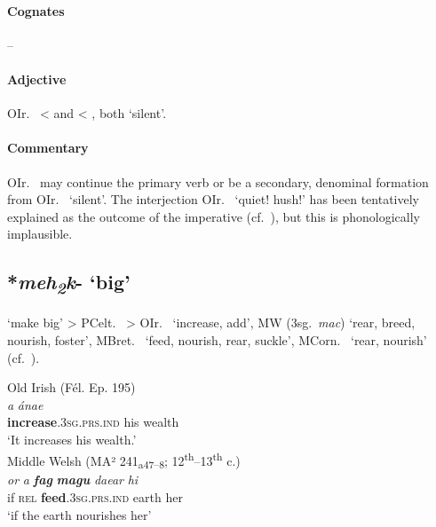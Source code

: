 \documentclass[output=paper,colorlinks,citecolor=brown]{langscibook}
\begin{document}
\paragraph*{Cognates}  -- 

\paragraph*{Adjective}

OIr.\  <  and  < , both `silent'. 

\paragraph*{Commentary}

OIr.\  may continue the primary verb  or be a secondary, denominal formation  from OIr.\   ‘silent’. The interjection OIr.\   ‘quiet! hush!’ has been tentatively explained as the outcome of the imperative  (cf.\ ), but this is phonologically implausible.

\subsection{*\textit{meh\textsubscript{2}k}- ‘big’}
\label{sec:STPbig}

 ‘make big’ > PCelt.\  > OIr.\   ‘increase, add’, MW  (3sg.\ \textit{mac}) ‘rear, breed, nourish, foster’, MBret.\  ‘feed, nourish, rear, suckle’, MCorn.\  ‘rear, nourish’ (cf.\ \citealt[466--470]{Schumacher2004}).

\begin{exe}
    \ex Old Irish (Fél. Ep. 195)\label{ex:STPbig1}\\
         \textit{a} \textit{ánae}  \\
        \textbf{increase}.\textsc{3sg.prs.ind} his wealth\\
        \glt ‘It increases his wealth.’\\
    \ex Middle Welsh (MA² 241\textsubscript{a47--8}; 12\textsuperscript{th}--13\textsuperscript{th} c.) \label{ex:STPbig2}\\
        \gll \textit{or} \textit{a} {\textbf{\textit{fag}} \textbf{\textit{magu}}} \textit{daear} \textit{hi} \\
        if \textsc{rel} \textbf{feed}.\textsc{3sg.prs.ind} earth her \\
        \glt ‘if the earth nourishes her’\\
\end{exe}
\end{document}
